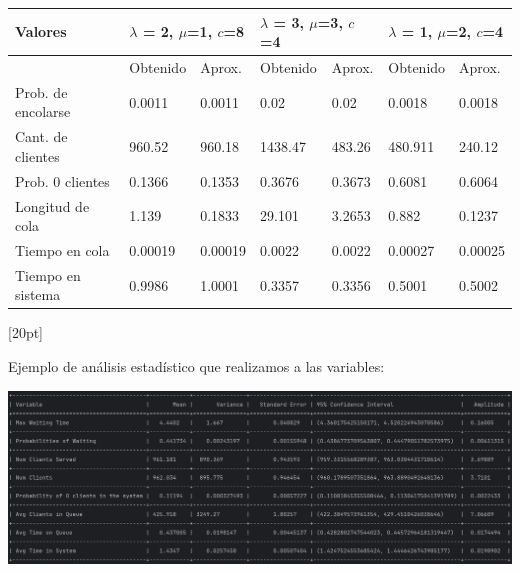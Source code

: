 \documentclass[11pt]{article}
\begin{document}
    \begin{table}[h]
\begin{tabular}{|l|ll|ll|ll|}
\hline
Valores                                  & \multicolumn{2}{l|}{$\lambda$ = 2, $\mu$=1, $c$=8}      & \multicolumn{2}{l|}{$\lambda$ = 3, $\mu$=3, $c$=4}       & \multicolumn{2}{l|}{$\lambda$ = 1, $\mu$=2, $c$=4}      \\ \hline
                                         & \multicolumn{1}{l|}{Obtenido} & Aprox. & \multicolumn{1}{l|}{Obtenido} & Aprox. & \multicolumn{1}{l|}{Obtenido} & Aprox. \\ \hline
Prob. de encolarse                       & 0.0011                                  & 0.0011       & 0.02                                    & 0.02         & 0.0018                                  & 0.0018       \\ \cline{1-1}
Cant. de clientes                     & 960.52                                  & 960.18       & 1438.47                                 & 483.26       & 480.911                                 & 240.12       \\ \cline{1-1}
Prob. 0 clientes                         & 0.1366                                  & 0.1353       & 0.3676                                  & 0.3673       & 0.6081                                  & 0.6064       \\ \cline{1-1}
Longitud de cola                & 1.139                                   & 0.1833       & 29.101                                  & 3.2653       & 0.882                                   & 0.1237       \\ \cline{1-1}
Tiempo en cola                  & 0.00019                                 & 0.00019      & 0.0022                                  & 0.0022       & 0.00027                                 & 0.00025      \\ \cline{1-1}
Tiempo en sistema               & 0.9986                                  & 1.0001       & 0.3357                                  & 0.3356       & 0.5001                                  & 0.5002       \\ \hline
\end{tabular}
\end{table}

[20pt]

    Ejemplo de análisis estadístico que realizamos a las variables:

    \includegraphics[width=1\textwidth]{images/8} \\
\end{document}
